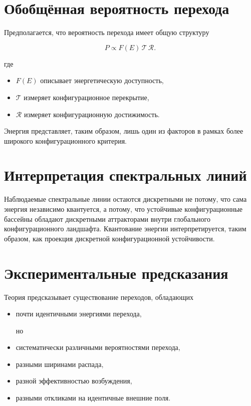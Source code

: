 \section{Обобщённая вероятность перехода}

Предполагается, что вероятность перехода имеет общую структуру

\[ \boxed{ P \propto F(E) \, \mathcal T \, \mathcal R. } \]

где

\begin{itemize}
\item $F(E)$ описывает энергетическую доступность,
\item $\mathcal T$ измеряет конфигурационное перекрытие,
\item $\mathcal R$ измеряет конфигурационную достижимость.
\end{itemize}

Энергия представляет, таким образом, лишь один из факторов в рамках более широкого конфигурационного критерия.

\section{Интерпретация спектральных линий}

Наблюдаемые спектральные линии остаются дискретными не потому, что сама энергия независимо квантуется, а потому, что устойчивые конфигурационные бассейны обладают дискретными аттракторами внутри глобального конфигурационного ландшафта. Квантование энергии интерпретируется, таким образом, как проекция дискретной конфигурационной устойчивости.

\section{Экспериментальные предсказания}

Теория предсказывает существование переходов, обладающих

\begin{itemize}
\item почти идентичными
энергиями перехода,

но

\item систематически различными
вероятностями перехода,

\item разными ширинами распада,

\item разной эффективностью возбуждения,

\item разными откликами
на идентичные внешние поля.
\end{itemize}

